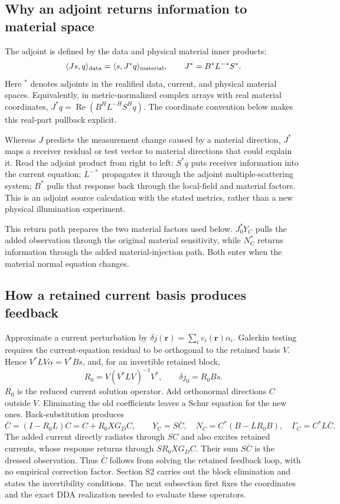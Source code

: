 \subsection*{Why an adjoint returns information to material space}
The adjoint is defined by the data and physical material inner products:
\[
\langle Js,q\rangle_{\rm data}=\langle s,J^*q\rangle_{\rm material},
\qquad J^*=B^*L^{-*}S^*.
\]
Here $^*$ denotes adjoints in the realified data, current, and physical material spaces. Equivalently, in metric-normalized complex arrays with real material coordinates, $J^*q=\operatorname{Re}(B^HL^{-H}S^Hq)$. The coordinate convention below makes this real-part pullback explicit.

Whereas $J$ predicts the measurement change caused by a material direction, $J^*$ maps a receiver residual or test vector to material directions that could explain it. Read the adjoint product from right to left: $S^*q$ puts receiver information into the current equation; $L^{-*}$ propagates it through the adjoint multiple-scattering system; $B^*$ pulls that response back through the local-field and material factors. This is an adjoint source calculation with the stated metrics, rather than a new physical illumination experiment.

This return path prepares the two material factors used below. $J_0^*Y_C$ pulls the added observation through the original material sensitivity, while $N_C^*$ returns information through the added material-injection path. Both enter when the material normal equation changes.

\subsection*{How a retained current basis produces feedback}
Approximate a current perturbation by $\delta j(\boldsymbol r)=\sum_i v_i(\boldsymbol r)\alpha_i$. Galerkin testing requires the current-equation residual to be orthogonal to the retained basis $V$. Hence $V^*LV\alpha=V^*Bs$, and, for an invertible retained block,
\[
R_0=V(V^*LV)^{-1}V^*,\qquad \delta j_0=R_0Bs.
\]
$R_0$ is the reduced current solution operator. Add orthonormal directions $C$ outside $V$. Eliminating the old coefficients leaves a Schur equation for the new ones. Back-substitution produces
\[
\bar C=(I-R_0L)C=C+R_0XG_DC,\qquad
Y_C=S\bar C,\quad N_C=C^*(B-LR_0B),\quad\Gamma_C=C^*L\bar C.
\]
The added current directly radiates through $SC$ and also excites retained currents, whose response returns through $SR_0XG_DC$. Their sum $S\bar C$ is the dressed observation. Thus $\bar C$ follows from solving the retained feedback loop, with no empirical correction factor. Section S2 carries out the block elimination and states the invertibility conditions. The next subsection first fixes the coordinates and the exact DDA realization needed to evaluate these operators.
